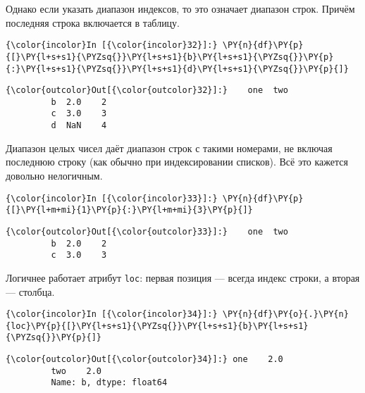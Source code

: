     Однако если указать диапазон индексов, то это означает диапазон строк.
Причём последняя строка включается в таблицу.

    \begin{Verbatim}[commandchars=\\\{\}]
{\color{incolor}In [{\color{incolor}32}]:} \PY{n}{df}\PY{p}{[}\PY{l+s+s1}{\PYZsq{}}\PY{l+s+s1}{b}\PY{l+s+s1}{\PYZsq{}}\PY{p}{:}\PY{l+s+s1}{\PYZsq{}}\PY{l+s+s1}{d}\PY{l+s+s1}{\PYZsq{}}\PY{p}{]}
\end{Verbatim}

            \begin{Verbatim}[commandchars=\\\{\}]
{\color{outcolor}Out[{\color{outcolor}32}]:}    one  two
         b  2.0    2
         c  3.0    3
         d  NaN    4
\end{Verbatim}
        
    Диапазон целых чисел даёт диапазон строк с такими номерами, не включая
последнюю строку (как обычно при индексировании списков). Всё это
кажется довольно нелогичным.

    \begin{Verbatim}[commandchars=\\\{\}]
{\color{incolor}In [{\color{incolor}33}]:} \PY{n}{df}\PY{p}{[}\PY{l+m+mi}{1}\PY{p}{:}\PY{l+m+mi}{3}\PY{p}{]}
\end{Verbatim}

            \begin{Verbatim}[commandchars=\\\{\}]
{\color{outcolor}Out[{\color{outcolor}33}]:}    one  two
         b  2.0    2
         c  3.0    3
\end{Verbatim}
        
    Логичнее работает атрибут \texttt{loc}: первая позиция --- всегда индекс
строки, а вторая --- столбца.

    \begin{Verbatim}[commandchars=\\\{\}]
{\color{incolor}In [{\color{incolor}34}]:} \PY{n}{df}\PY{o}{.}\PY{n}{loc}\PY{p}{[}\PY{l+s+s1}{\PYZsq{}}\PY{l+s+s1}{b}\PY{l+s+s1}{\PYZsq{}}\PY{p}{]}
\end{Verbatim}

            \begin{Verbatim}[commandchars=\\\{\}]
{\color{outcolor}Out[{\color{outcolor}34}]:} one    2.0
         two    2.0
         Name: b, dtype: float64
\end{Verbatim}
        
